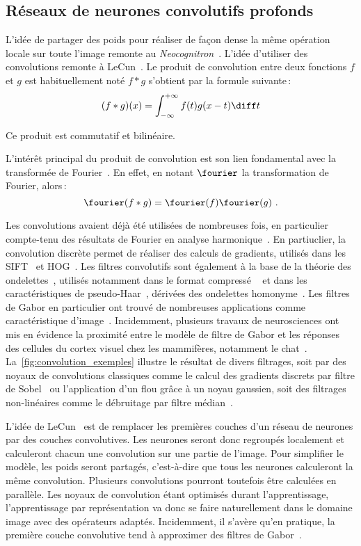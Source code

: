 \subsection{Réseaux de neurones convolutifs profonds}

L'idée de partager des poids pour réaliser de façon dense la même opération locale sur toute l'image remonte au \emph{Neocognitron}~\cite{fukushima_neocognitron_1980}. L'idée d'utiliser des convolutions remonte à LeCun~\cite{lecun_gradient-based_1998}. Le produit de convolution entre deux fonctions $f$ et $g$ est habituellement noté $f * g$ s'obtient par la formule suivante\,:
$$(f * g)(x) = \int_{-\infty}^{+\infty} f(t)g(x-t) \diff t$$

Ce produit est commutatif et bilinéaire.

L'intérêt principal du produit de convolution est son lien fondamental avec la transformée de Fourier~\cite{fourier_propagation_1822}. En effet, en notant $\fourier$ la transformation de Fourier, alors\,:
$$\fourier(f \ast g) = \fourier (f)\fourier (g)~.$$

Les convolutions avaient déjà été utilisées de nombreuses fois, en particulier compte-tenu des résultats de Fourier en analyse harmonique~\cite{fourier_propagation_1822}. En partiuclier, la convolution discrète permet de réaliser des calculs de gradients, utilisés dans les \gls{SIFT}~\cite{lowe_object_1999} et \gls{HOG}~\cite{dalal_histograms_2005}. Les filtres convolutifs sont également à la base de la théorie des ondelettes~\cite{mallat_exploration_2001}, utilisés notamment dans le format compressé ~\cite{daubechies_ten_1992} et dans les caractéristiques de pseudo-Haar~\cite{viola_robust_2001}, dérivées des ondelettes homonyme~\cite{papageorgiou_general_1998}.
Les filtres de Gabor en particulier ont trouvé de nombreuses applications comme caractéristique d'image~\cite{pati_word_2008}. Incidemment, plusieurs travaux de neurosciences ont mis en évidence la proximité entre le modèle de filtre de Gabor et les réponses des cellules du cortex visuel chez les mammifères, notamment le chat~\cite{marcelja_mathematical_1980,jones_evaluation_1987}. La~\cref{fig:convolution_exemples} illustre le résultat de divers filtrages, soit par des noyaux de convolutions classiques comme le calcul des gradients discrets par filtre de Sobel~\cite{sobel_isotropic_2014} ou l'application d'un flou grâce à un noyau gaussien, soit des filtrages non-linéaires comme le débruitage par filtre médian~\cite{frieden_new_1976}.

L'idée de LeCun~\cite{lecun_gradient-based_1998} est de remplacer les premières couches d'un réseau de neurones par des couches convolutives. Les neurones seront donc regroupés localement et calculeront chacun une convolution sur une partie de l'image. Pour simplifier le modèle, les poids seront partagés, c'est-à-dire que tous les neurones calculeront la même convolution. Plusieurs convolutions pourront toutefois être calculées en parallèle. Les noyaux de convolution étant optimisés durant l'apprentissage, l'apprentissage par représentation va donc se faire naturellement dans le domaine image avec des opérateurs adaptés. Incidemment, il s'avère qu'en pratique, la première couche convolutive tend à approximer des filtres de Gabor~\cite{yosinski_how_2014}.

